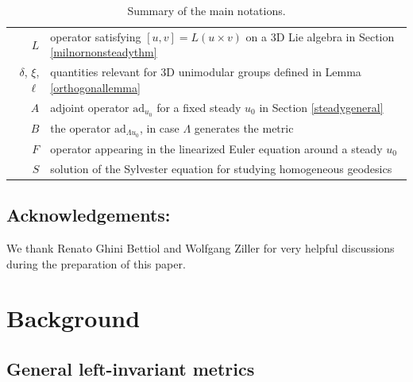 \documentclass[oneside, 11pt]{amsart}
\numberwithin{equation}{section}
\newcommand{\ad}{\mathrm{ad}}
\newcommand{\Syl}{S}
\newcommand{\eulerop}{F}
\newcommand{\adop}{A}
\newcommand{\adlambop}{B}
\begin{document}
\begin{table}[h!]
\begin{tabular}{r|l}
$L$ & operator satisfying $[u,v] = L(u\times v)$ on a 3D Lie algebra in Section \ref{milnornonsteadythm} \\
$\delta$, $\xi$, $\ell$ & quantities relevant for 3D unimodular groups defined in Lemma \ref{orthogonallemma} \\
$\adop$ & adjoint operator $\ad_{u_0}$ for a fixed steady $u_0$ in Section \ref{steadygeneral} \\
$\adlambop$ & the operator $\ad_{\Lambda u_0}$, in case $\Lambda$ generates the metric \\
$\eulerop$ &  operator appearing in the linearized Euler equation around a steady $u_0$ \\ 
$\Syl$  & solution of the Sylvester equation for studying homogeneous geodesics\\
\hline
\end{tabular}
\caption{Summary of the main notations.}
\end{table}


\subsection{Acknowledgements:} We thank Renato Ghini Bettiol and Wolfgang Ziller for very helpful discussions during the preparation of this paper.

\section{Background}\label{sec:background}



\subsection{General left-invariant metrics}\label{sec:background-lie-groups}
\end{document}
